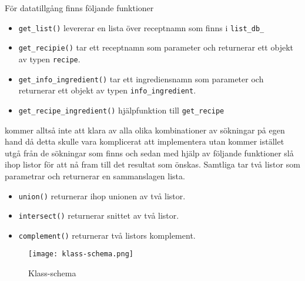För datatillgång finns följande funktioner

\begin{itemize}
\item   \verb+get_list()+ levererar en lista över receptnamn som finns i \verb+list_db_+
\item   \verb+get_recipie()+ tar ett receptnamn som parameter och returnerar ett objekt av typen \verb+recipe+.
\item   \verb+get_info_ingredient()+ tar ett ingrediensnamn som parameter och returnerar ett objekt av typen \verb+info_ingredient+.
\item   \verb+get_recipe_ingredient()+ hjälpfunktion till \verb+get_recipe+
\end{itemize}

\Lookup kommer alltså inte att klara av alla olika kombinationer av sökningar på egen hand då detta skulle vara komplicerat att implementera utan kommer istället utgå från de sökningar som finns och sedan med hjälp av följande funktioner slå ihop listor för att nå fram till det resultat som önskas. Samtliga tar två listor som parametrar och returnerar en sammanslagen lista.

\begin{itemize}
\item   \verb+union()+ returnerar ihop unionen av två listor.
\item   \verb+intersect()+ returnerar snittet av två listor.
\item   \verb+complement()+ returnerar två listors komplement.
\end{itemize}

\begin{figure}[h]
\centering
\texttt{[image: klass-schema.png]}
\caption{Klass-schema}
\label{fig:classes}
\end{figure}

